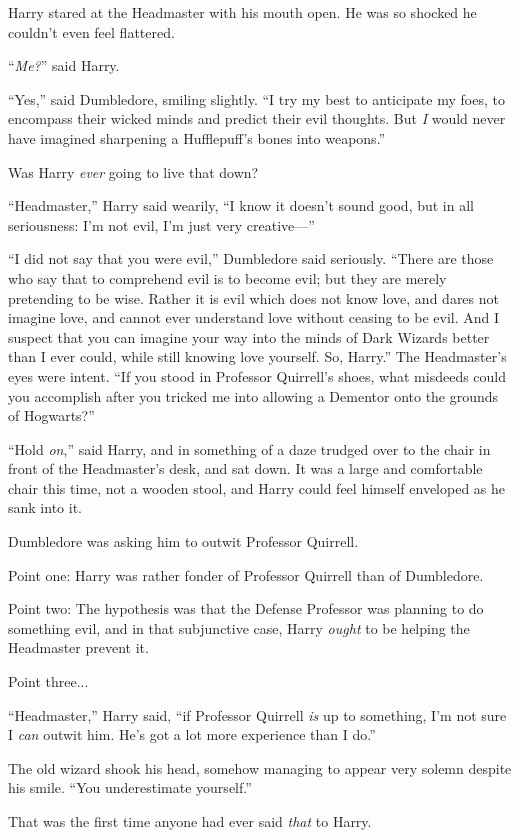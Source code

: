 Harry stared at the Headmaster with his mouth open. He was so shocked he couldn’t even feel flattered.

“\emph{Me?}” said Harry.

“Yes,” said Dumbledore, smiling slightly. “I try my best to anticipate my foes, to encompass their wicked minds and predict their evil thoughts. But \emph{I} would never have imagined sharpening a Hufflepuff’s bones into weapons.”

Was Harry \emph{ever} going to live that down?

“Headmaster,” Harry said wearily, “I know it doesn’t sound good, but in all seriousness: I’m not evil, I’m just very creative—”

“I did not say that you were evil,” Dumbledore said seriously. “There are those who say that to comprehend evil is to become evil; but they are merely pretending to be wise. Rather it is evil which does not know love, and dares not imagine love, and cannot ever understand love without ceasing to be evil. And I suspect that you can imagine your way into the minds of Dark Wizards better than I ever could, while still knowing love yourself. So, Harry.” The Headmaster’s eyes were intent. “If you stood in Professor Quirrell’s shoes, what misdeeds could you accomplish after you tricked me into allowing a Dementor onto the grounds of Hogwarts?”

“Hold \emph{on},” said Harry, and in something of a daze trudged over to the chair in front of the Headmaster’s desk, and sat down. It was a large and comfortable chair this time, not a wooden stool, and Harry could feel himself enveloped as he sank into it.

Dumbledore was asking him to outwit Professor Quirrell.

Point one: Harry was rather fonder of Professor Quirrell than of Dumbledore.

Point two: The hypothesis was that the Defense Professor was planning to do something evil, and in that subjunctive case, Harry \emph{ought} to be helping the Headmaster prevent it.

Point three...

“Headmaster,” Harry said, “if Professor Quirrell \emph{is} up to something, I’m not sure I \emph{can} outwit him. He’s got a lot more experience than I do.”

The old wizard shook his head, somehow managing to appear very solemn despite his smile. “You underestimate yourself.”

That was the first time anyone had ever said \emph{that} to Harry.

